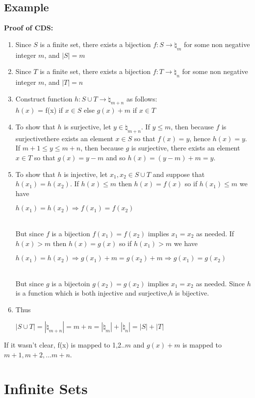\documentclass[12pt]{report}
\begin{document}
		\subsection{Example}
			\textbf{Proof of CDS:}
			\begin{enumerate}
				\item Since $S$ is a finite set, there exists a bijection $f:S \rightarrow \natural_m$ for some non negative integer $m$, and $|S| = m$
				\item Since $T$ is a finite set, there exists a bijection $f:T \rightarrow \natural_n$ for some non negative integer $m$, and $|T| = n$
				\item Construct function $h:S \cup T \rightarrow \natural_{m+n}$ as follows: \\
				$h(x)$ = f(x) if $x \in S$ else $g(x) + m$ if $x \in T$
				\item To show that $h$ is surjective, let $y \in \natural_{m+n}$. If $y \leq m$, then because $f$ is surjectivethere exists an element $x \in S$ so that $f(x) = y$, hence $h(x) = y$. If $m+1 \leq y \leq m + n$, then because $g$ is surjective, there exists an element $x \in T$ so that $g(x) = y-m$ and so $h(x) = (y-m) + m = y$.
				\item To show that $h$ is injective, let $x_1, x_2 \in S \cup T$ and suppose that $h(x_1) = h(x_2)$. If $h(x) \leq m$ then $h(x) = f(x)$ so if $h(x_1) \leq m$ we have\\
				\centerline{$h(x_1) = h(x_2) \Rightarrow f(x_1) = f(x_2)$} \\
				But since $f$ is a bijection $f(x_1) = f(x_2)$ implies $x_1 = x_2$ as needed. If $h(x) > m$ then $h(x) = g(x)$ so if $h(x_1) > m$ we have \\
				\centerline{$h(x_1) = h(x_2) \Rightarrow g(x_1) + m = g(x_2) + m \Rightarrow g(x_1) = g(x_2)$} \\
				But since $g$ is a bijectoin $g(x_2) = g(x_2) $ implies $x_1 = x_2$ as needed. Since $h$ is a function which is both injective and surjective,$h$ is bijective.
				\item Thus \\
				\centerline{$|S \cup T| = |\natural_{m+n}| = m+n=|\natural_m| + |\natural_n| = |S| + |T|$}
			\end{enumerate}
			If it wasn't clear, f(x) is mapped to 1,2..$m$ and $g(x) + m$ is mapped to $m+1, m+2,$...$m+n$.
	\section{Infinite Sets}
\end{document}

